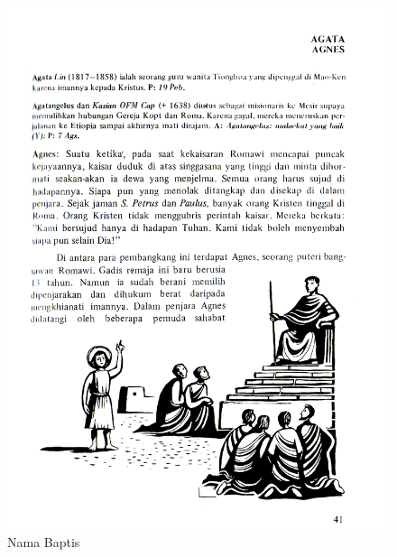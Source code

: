 \begin{figure}[htbp]
		\centering
			\includegraphics[scale=0.9]{Gambar/sc0005.JPG}
			\caption{Nama Baptis}
		\label{fig:namabaptis2}
	\end{figure}

